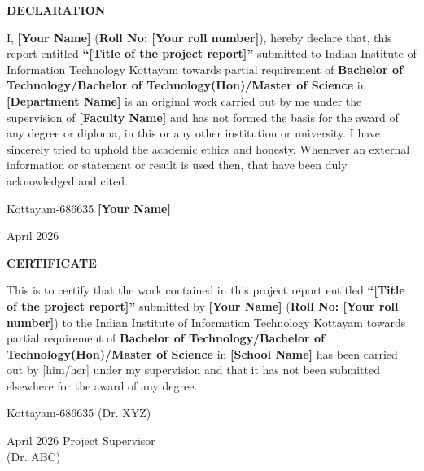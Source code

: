 \documentclass[12pt,a4wide]{report}
\theoremstyle{plain}
\theoremstyle{definition}
\theoremstyle{remark}
\begin{document}
\clearpage
 \setcounter{page}{2}
\begin{center}
{\large{\bf{DECLARATION}}}
\end{center}


\noindent I, \textbf{[Your Name]} (\textbf{Roll No: [Your roll
number]}), hereby declare that, this report entitled
\textbf{``[Title of the project report]''} submitted to Indian
Institute of Information Technology Kottayam towards partial
requirement of {\bf Bachelor of Technology/Bachelor of
Technology(Hon)/Master of Science} in \textbf{[Department  Name]}
is an original work carried out by me under the supervision of
\textbf{[Faculty Name]} and has not formed the basis for the award
of any degree or diploma, in this or any other institution or
university. I have sincerely tried to uphold the academic ethics
and honesty. Whenever an external information or statement or
result is used then, that have been duly acknowledged and cited.

\vspace{4cm}

\noindent Kottayam-686635 \hfill \textbf{[Your Name]}

\noindent April 2026

\clearpage


 \setcounter{page}{3}
\begin{center}
{\large{\bf{CERTIFICATE}}}
\end{center}


\noindent This is to certify that the work contained in this
project report entitled \textbf{``[Title of the project report]''}
submitted by \textbf{[Your Name]} (\textbf{Roll No: [Your roll
number]}) to the Indian Institute of Information Technology Kottayam
towards partial requirement of {\bf Bachelor of
Technology/Bachelor of Technology(Hon)/Master of Science} in
\textbf{[School Name]} has been carried out by [him/her] under my
supervision and that it has not been submitted elsewhere for the
award of any degree.


\vspace{4cm}

\noindent Kottayam-686635  \hfill (Dr. XYZ)

\noindent April 2026 \hfill Project Supervisor\\

\vspace{2.5cm}
\noindent\hfill\hfill (Dr. ABC)
\end{document}
